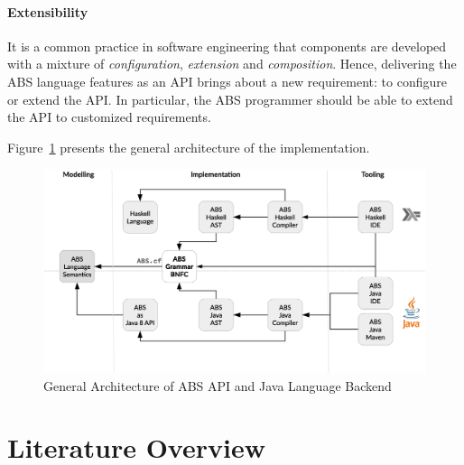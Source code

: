 
\paragraph{Extensibility}
It is a common practice in software engineering that components are developed with a mixture of \emph{configuration}, \emph{extension} and \emph{composition}.
Hence, delivering the ABS language features as an API brings about a new requirement: to configure or extend the API. 
In particular, the ABS programmer should be able to extend the API to customized requirements. 

Figure~\ref{fig:arch} presents the general architecture of the implementation.


\begin{figure}[h]
\centering
\includegraphics[scale=0.3]{../figs/Arch.eps}
\caption[General Architecture]{General Architecture of ABS API and Java Language Backend}
\label{fig:arch}
\end{figure}

\section{Literature Overview}
\label{sec:intro:rel}

